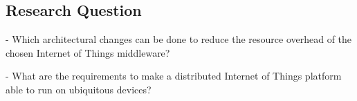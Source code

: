 \subsection{Research Question}
- Which architectural changes can be done to reduce the resource overhead of the chosen Internet of Things middleware?

- What are the requirements to make a distributed Internet of Things platform able to run on ubiquitous devices?

